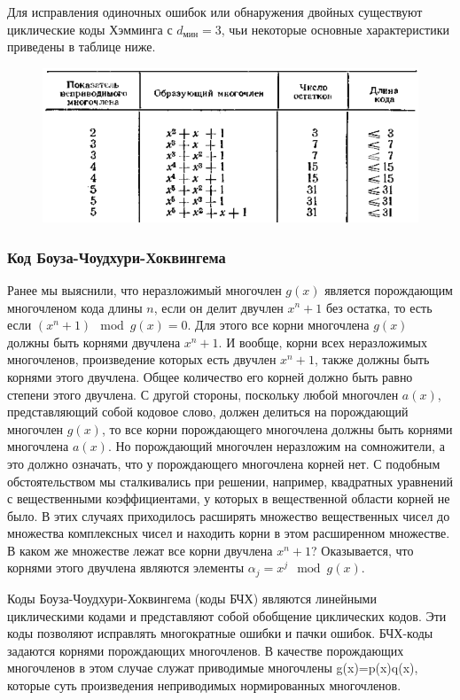 \documentclass[12pt,a4paper]{article}
\begin{document}
  Для исправления одиночных ошибок или обнаружения двойных существуют циклические коды Хэмминга с $d_\text{мин}=3$, чьи некоторые основные характеристики приведены в таблице ниже.
  \begin{figure}[H]
	  \centering
	  \includegraphics[scale=0.7]{table}
  \end{figure}
  
\subsubsection{Код Боуза-Чоудхури-Хоквингема}
  
  Ранее мы выяснили, что неразложимый многочлен $g(x)$ является порождающим многочленом кода длины $n$, если он делит двучлен $x^n+1$ без остатка, то есть если $(x^n+1)\mod g(x)=0$. Для этого все корни многочлена $g(x)$ должны быть корнями двучлена $x^n+1$. И вообще, корни всех неразложимых многочленов, произведение которых есть двучлен $x^n+1$, также должны  быть  корнями  этого  двучлена.  Общее  количество  его  корней должно быть равно степени этого двучлена. С другой стороны, поскольку любой многочлен $a(x)$, представляющий собой кодовое слово, должен делиться на порождающий многочлен $g(x)$, то все корни порождающего многочлена должны быть корнями многочлена $a(x)$. Но порождающий многочлен неразложим на сомножители, а это должно означать, что  у  порождающего  многочлена  корней  нет.  С  подобным обстоятельством  мы  сталкивались  при  решении,  например,  квадратных уравнений с вещественными коэффициентами, у которых в вещественной области корней не было. В этих случаях приходилось расширять множество вещественных чисел до множества комплексных чисел и находить корни в этом расширенном множестве. В каком же множестве лежат все корни двучлена $x^n+1$? Оказывается, что корнями этого двучлена являются элементы  $\alpha_j=x^j\mod g(x)$.
  
  Коды Боуза-Чоудхури-Хоквингема (коды БЧХ) являются линейными циклическими кодами и представляют собой обобщение циклических кодов. Эти коды позволяют исправлять многократные ошибки и пачки ошибок. БЧХ-коды задаются корнями порождающих многочленов. В качестве порождающих многочленов в этом случае служат приводимые многочлены g(x)=p(x)q(x),  которые  суть  произведения  неприводимых нормированных 
многочленов.
  
\end{document}
